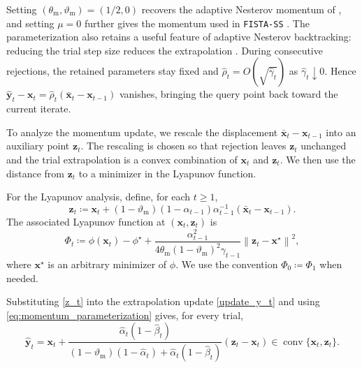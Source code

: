 \documentclass{article}
\begin{document}
\begin{remark}
\label{rem:classical_momentum_specialization}
Setting $(\theta_{\mathrm m},\vartheta_{\mathrm m})=(1/2,0)$ recovers the adaptive Nesterov momentum of
\cite{localLip}, and setting $\mu=0$ further gives the momentum used in \texttt{FISTA-SS}
\cite{stoFISTA}. The parameterization also retains a useful feature of adaptive Nesterov backtracking: reducing the trial step size reduces the extrapolation
\cite[Appendix~B.3.1, Algorithm~31]{d2021acceleration}. During consecutive rejections, the retained parameters stay fixed and $\hat\rho_t=O(\sqrt{\hat\gamma_t})$ as $\hat\gamma_t\downarrow0$. Hence $\hat{\bm{y}}_t-\bm{x}_t=\hat\rho_t(\bar{\bm{x}}_t-\bm{x}_{t-1})$ vanishes, bringing the query point back toward the current iterate.
\end{remark}

To analyze the momentum update, we rescale the displacement $\bar{\bm{x}}_t-\bm{x}_{t-1}$ into an auxiliary point $\bm{z}_t$. The rescaling is chosen so that rejection leaves $\bm{z}_t$ unchanged and the trial extrapolation is a convex combination of $\bm{x}_t$ and $\bm{z}_t$. We then use the distance from $\bm{z}_t$ to a minimizer in the Lyapunov function.

\begin{definition}
\label{def:Lyapunov_struct}
For the Lyapunov analysis, define, for each \(t\ge1\),
\begin{equation}\label{z_t}
\bm{z}_t
\coloneqq 
\bm{x}_t+
(1-\vartheta_{\mathrm{m}})(1-\alpha_{t-1})\alpha_{t-1}^{-1}
(\bar {\bm{x}}_t-\bm{x}_{t-1}).
\end{equation}
The associated Lyapunov function at \((\bm{x}_t,\bm{z}_t)\) is
\begin{equation}\label{Energy}
\Phi_{t}
\coloneqq 
\phi(\bm{x}_t)-\phi^\star
+
\frac{\alpha_{t-1}^2}
{4\theta_{\mathrm{m}}(1-\vartheta_{\mathrm{m}})^2\gamma_{t-1}}
\left\|\bm{z}_t-\bm{x}^\star\right\|^2,
\end{equation}
where \(\bm{x}^\star\) is an arbitrary minimizer of \(\phi\). We use the convention \(\Phi_0\coloneqq \Phi_1\) when needed.
\end{definition}
Substituting \eqref{z_t}  into the extrapolation update \eqref{update_y_t} and using \eqref{eq:momentum_parameterization} gives, for every trial,
\begin{equation}\label{eq:yhat_zt}
\hat {\bm{y}}_t
=
\bm{x}_t+
\frac{\hat\alpha_t(1-\hat\beta_t)}
{(1-\vartheta_{\mathrm{m}})(1-\hat\alpha_t)
+\hat\alpha_t(1-\hat\beta_t)}
(\bm{z}_t-\bm{x}_t)
\in\operatorname{conv}\{\bm{x}_t,\bm{z}_t\}.
\end{equation}
\end{document}
